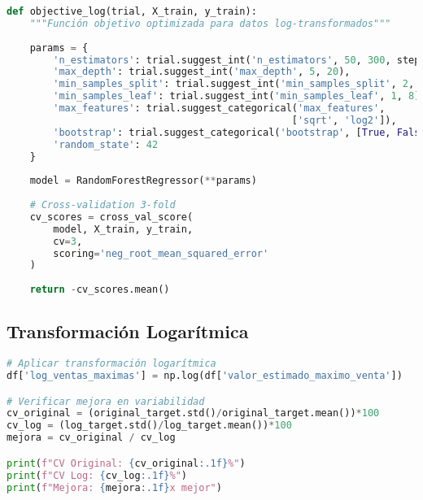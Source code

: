 \documentclass[12pt,a4paper]{article}
\begin{document}
\begin{lstlisting}[language=Python, caption=Función objetivo para optimización con Optuna]
def objective_log(trial, X_train, y_train):
    """Función objetivo optimizada para datos log-transformados"""
    
    params = {
        'n_estimators': trial.suggest_int('n_estimators', 50, 300, step=25),
        'max_depth': trial.suggest_int('max_depth', 5, 20),
        'min_samples_split': trial.suggest_int('min_samples_split', 2, 15),
        'min_samples_leaf': trial.suggest_int('min_samples_leaf', 1, 8),
        'max_features': trial.suggest_categorical('max_features', 
                                                 ['sqrt', 'log2']),
        'bootstrap': trial.suggest_categorical('bootstrap', [True, False]),
        'random_state': 42
    }
    
    model = RandomForestRegressor(**params)
    
    # Cross-validation 3-fold
    cv_scores = cross_val_score(
        model, X_train, y_train, 
        cv=3,
        scoring='neg_root_mean_squared_error'
    )
    
    return -cv_scores.mean()
\end{lstlisting}

\subsection{Transformación Logarítmica}

\begin{lstlisting}[language=Python, caption=Aplicación de transformación logarítmica]
# Aplicar transformación logarítmica
df['log_ventas_maximas'] = np.log(df['valor_estimado_maximo_venta'])

# Verificar mejora en variabilidad
cv_original = (original_target.std()/original_target.mean())*100
cv_log = (log_target.std()/log_target.mean())*100
mejora = cv_original / cv_log

print(f"CV Original: {cv_original:.1f}%")
print(f"CV Log: {cv_log:.1f}%") 
print(f"Mejora: {mejora:.1f}x mejor")
\end{lstlisting}
\end{document}
